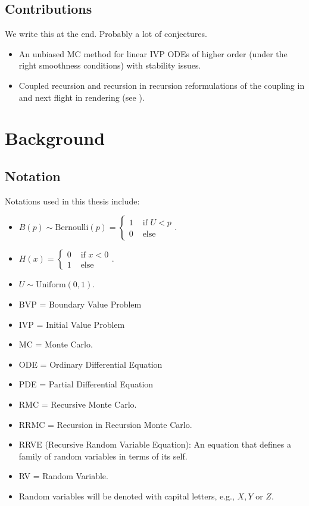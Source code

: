 \documentclass[a4paper,12pt]{article}
\begin{document}



\subsection{Contributions}
We write this at the end. Probably a lot of conjectures.\\

\begin{itemize}
    \item An unbiased MC method for linear IVP ODEs of higher order (under
          the right smoothness conditions) with stability issues.
    \item Coupled recursion and recursion in recursion reformulations of the coupling in
          \cite{vicini_path_2021} and next flight in rendering (see \cite{sawhney_grid-free_2022}).
\end{itemize}



\section{Background}

\subsection{Notation}
Notations used in this thesis include:

\begin{itemize}
    \item $B(p) \sim \text{Bernoulli}(p) =
              \begin{cases}
                  1 & \text{ if } U<p \\
                  0 & \text{ else }
              \end{cases}. $
    \item $ H(x) =
              \begin{cases}
                  0 & \text{ if } x<0 \\
                  1 & \text{ else }
              \end{cases}.$
    \item $U \sim \text{Uniform}(0,1)$.
    \item BVP = Boundary Value Problem
    \item IVP = Initial Value Problem
    \item MC = Monte Carlo.
    \item ODE = Ordinary Differential Equation
    \item PDE = Partial Differential Equation
    \item RMC = Recursive Monte Carlo.
    \item RRMC = Recursion in Recursion Monte Carlo.
    \item RRVE (Recursive Random Variable Equation): An equation that defines a
          family of random variables in terms of its self.
    \item RV = Random Variable.
    \item Random variables will be denoted with capital letters, e.g., $X,Y$ or $Z$.
\end{itemize}
\end{document}
